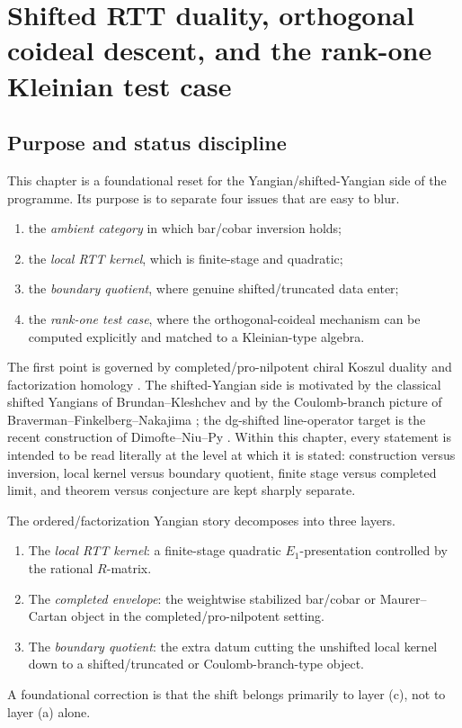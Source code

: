
\chapter{Shifted RTT duality, orthogonal coideal descent, and the rank-one Kleinian test case}
\label{chap:shifted-rtt-orthogonal-coideals}

\section{Purpose and status discipline}
\label{sec:purpose-status-discipline}

This chapter is a foundational reset for the Yangian/shifted-Yangian side of the
programme. Its purpose is to separate four issues that are easy to blur.

\begin{enumerate}[label=\textup{(\roman*)}]
\item the \emph{ambient category} in which bar/cobar inversion holds;
\item the \emph{local RTT kernel}, which is finite-stage and quadratic;
\item the \emph{boundary quotient}, where genuine shifted/truncated data enter;
\item the \emph{rank-one test case}, where the orthogonal-coideal mechanism can
 be computed explicitly and matched to a Kleinian-type algebra.
\end{enumerate}

The first point is governed by completed/pro-nilpotent chiral Koszul duality and
factorization homology \cite{FG12,AF15,AF20}. The shifted-Yangian side is
motivated by the classical shifted Yangians of Brundan--Kleshchev and by the
Coulomb-branch picture of Braverman--Finkelberg--Nakajima
\cite{BrunKlesh06,BFN18}; the dg-shifted line-operator target is the recent
construction of Dimofte--Niu--Py \cite{DNP25}. Within this chapter, every
statement is intended to be read literally at the level at which it is stated:
construction versus inversion, local kernel versus boundary quotient, finite
stage versus completed limit, and theorem versus conjecture are kept sharply
separate.

\begin{definition}
\label{def:three-layers-ordered-theory-appendix}
The ordered/factorization Yangian story decomposes into three layers.
\begin{enumerate}[label=\textup{(\alph*)}]
\item The \emph{local RTT kernel}: a finite-stage quadratic $E_1$-presentation
 controlled by the rational $R$-matrix.
\item The \emph{completed envelope}: the weightwise stabilized bar/cobar or
 Maurer--Cartan object in the completed/pro-nilpotent setting.
\item The \emph{boundary quotient}: the extra datum cutting the unshifted local
 kernel down to a shifted/truncated or Coulomb-branch-type object.
\end{enumerate}
A foundational correction is that the shift belongs primarily to layer
\textup{(c)}, not to layer \textup{(a)} alone.
\end{definition}

